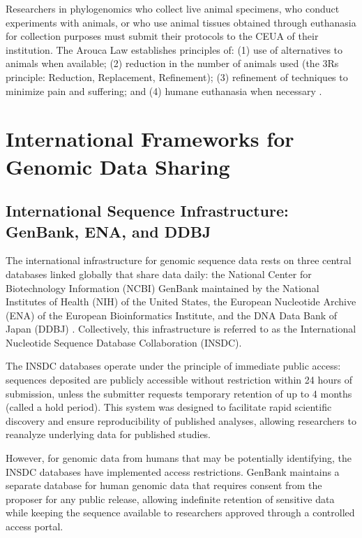 Researchers in phylogenomics who collect live animal specimens, who conduct experiments with animals, or who use animal tissues obtained through euthanasia for collection purposes must submit their protocols to the CEUA of their institution. The Arouca Law establishes principles of: (1) use of alternatives to animals when available; (2) reduction in the number of animals used (the 3Rs principle: Reduction, Replacement, Refinement); (3) refinement of techniques to minimize pain and suffering; and (4) humane euthanasia when necessary \parencite{brasil2008arouca}.

\section{International Frameworks for Genomic Data Sharing}

\subsection{International Sequence Infrastructure: GenBank, ENA, and DDBJ}

The international infrastructure for genomic sequence data rests on three central databases linked globally that share data daily: the National Center for Biotechnology Information (NCBI) GenBank maintained by the National Institutes of Health (NIH) of the United States, the European Nucleotide Archive (ENA) of the European Bioinformatics Institute, and the DNA Data Bank of Japan (DDBJ) \parencite{genbank2023, ena2023, ddbj2023}. Collectively, this infrastructure is referred to as the International Nucleotide Sequence Database Collaboration (INSDC).

The INSDC databases operate under the principle of immediate public access: sequences deposited are publicly accessible without restriction within 24 hours of submission, unless the submitter requests temporary retention of up to 4 months (called a hold period). This system was designed to facilitate rapid scientific discovery and ensure reproducibility of published analyses, allowing researchers to reanalyze underlying data for published studies.

However, for genomic data from humans that may be potentially identifying, the INSDC databases have implemented access restrictions. GenBank maintains a separate database for human genomic data that requires consent from the proposer for any public release, allowing indefinite retention of sensitive data while keeping the sequence available to researchers approved through a controlled access portal.

